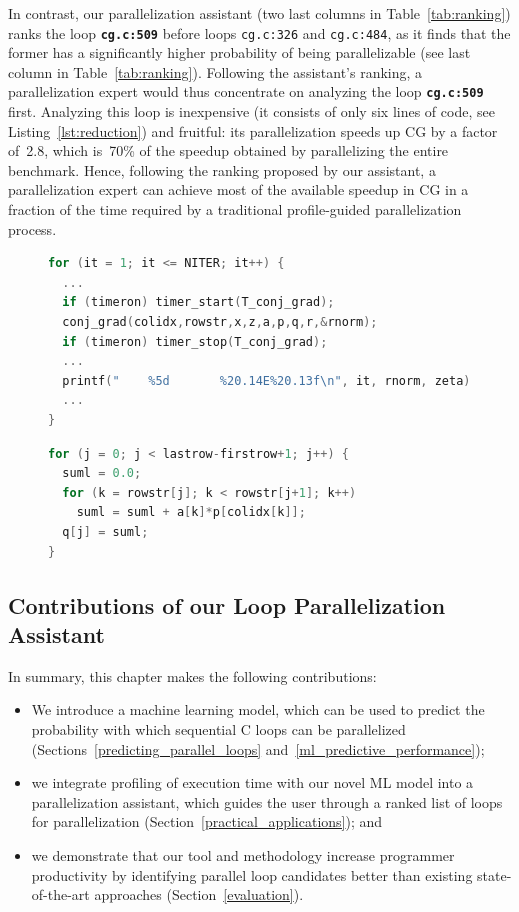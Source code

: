 In contrast, our parallelization assistant (two last columns in
Table~\ref{tab:ranking}) ranks the loop \textbf{\texttt{cg.c:509}} before
loops \texttt{cg.c:326} and \texttt{cg.c:484}, as it finds that the former has a
significantly higher probability of being parallelizable (see last column in
Table~\ref{tab:ranking}).
%
Following the assistant's ranking, a parallelization expert would thus
concentrate on analyzing the loop \textbf{\texttt{cg.c:509}} first.
%
Analyzing this loop is inexpensive (it consists of only six lines of code, see
Listing~\ref{lst:reduction}) and fruitful: its parallelization speeds up CG by a
factor of~2.8, which is~70\% of the speedup obtained by parallelizing the entire
benchmark.
%
Hence, following the ranking proposed by our assistant, a parallelization expert
can achieve most of the available speedup in CG in a fraction of the time
required by a traditional profile-guided parallelization process.
\begin{figure}[t]
\begin{lstlisting}[caption={\texttt{cg.c:326}. Longest running loop in CG. The loop cannot be parallelized due to
inter-iteration dependences and side effects caused by system calls.},label={lst:main_iter},language=C]
for (it = 1; it <= NITER; it++) {
  ...
  if (timeron) timer_start(T_conj_grad);
  conj_grad(colidx,rowstr,x,z,a,p,q,r,&rnorm);
  if (timeron) timer_stop(T_conj_grad);
  ...
  printf("    %5d       %20.14E%20.13f\n", it, rnorm, zeta);
  ...
}
\end{lstlisting}
\begin{lstlisting}[caption={\textbf{\texttt{cg.c:509}}. Longest running loop in CG among those \emph{that can be parallelized}.},label={lst:reduction},language=C]
for (j = 0; j < lastrow-firstrow+1; j++) {
  suml = 0.0;
  for (k = rowstr[j]; k < rowstr[j+1]; k++)
    suml = suml + a[k]*p[colidx[k]];
  q[j] = suml;
}
\end{lstlisting}
\end{figure}
\subsection{Contributions of our Loop Parallelization Assistant}
\quad In summary, this chapter makes the following contributions:
%
\begin{itemize}
\renewcommand\labelitemi{$\vartriangleright$}
\renewcommand\labelitemii{$\bullet$}
\item We introduce a machine learning model, which can be used to predict the probability with which sequential C loops can be parallelized (Sections~\ref{predicting_parallel_loops} and~\ref{ml_predictive_performance});
\item we integrate profiling of execution time with our novel ML model into a parallelization assistant, which guides the user through a ranked list of loops for parallelization (Section~\ref{practical_applications}); and
\item we demonstrate that our tool and methodology increase programmer productivity by identifying parallel loop candidates better than existing state-of-the-art approaches (Section~\ref{evaluation}).
\end{itemize}

